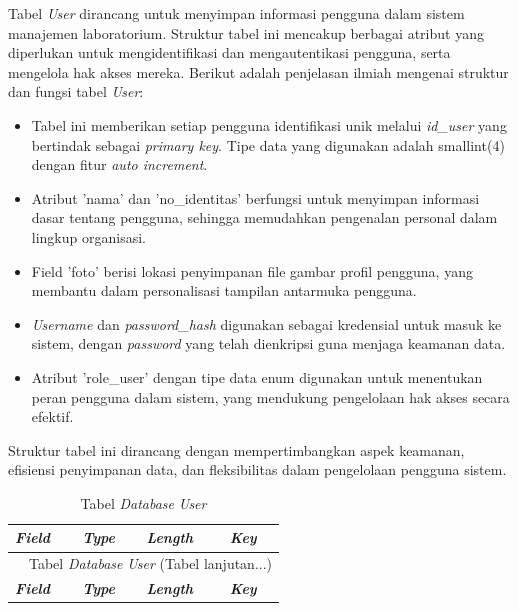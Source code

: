 \begin{enumerate}
	      Tabel \textit{User} dirancang untuk menyimpan informasi pengguna dalam sistem manajemen laboratorium. Struktur tabel ini mencakup berbagai atribut yang diperlukan untuk mengidentifikasi dan mengautentikasi pengguna, serta mengelola hak akses mereka. Berikut adalah penjelasan ilmiah mengenai struktur dan fungsi tabel \textit{User}:

	      \begin{itemize}
		      \item Tabel ini memberikan setiap pengguna identifikasi unik melalui \textit{id\_user} yang bertindak sebagai \textit{primary key}. Tipe data yang digunakan adalah smallint(4) dengan fitur \textit{auto increment}.
		      \item Atribut 'nama' dan 'no\_identitas' berfungsi untuk menyimpan informasi dasar tentang pengguna, sehingga memudahkan pengenalan personal dalam lingkup organisasi.
		      \item Field 'foto' berisi lokasi penyimpanan file gambar profil pengguna, yang membantu dalam personalisasi tampilan antarmuka pengguna.
		      \item \textit{Username} dan \textit{password\_hash} digunakan sebagai kredensial untuk masuk ke sistem, dengan \textit{password} yang telah dienkripsi guna menjaga keamanan data.
		      \item Atribut 'role\_user' dengan tipe data enum digunakan untuk menentukan peran pengguna dalam sistem, yang mendukung pengelolaan hak akses secara efektif.
	      \end{itemize}

	      Struktur tabel ini dirancang dengan mempertimbangkan aspek keamanan, efisiensi penyimpanan data, dan fleksibilitas dalam pengelolaan pengguna sistem.

		      {
			      \fontsize{10}{12}\selectfont
			      \begin{longtable}{l l l l}
				      \caption{Tabel \textit{\textit{Database}} \textit{User}}
				      \label{admin}                                                                                                                 \\
				      \hline
				      \textbf{\textit{Field}} & \textbf{\textit{Type}} & \textbf{\textit{Length}}                           & \textbf{\textit{Key}} \\
				      \hline
				      \endfirsthead

				      \multicolumn{4}{c}{\tablename\ \thetable\ {Tabel \textit{\textit{Database}} \textit{User}} \space (Tabel lanjutan...)}        \\
				      \hline
				      \textbf{\textit{Field}} & \textbf{\textit{Type}} & \textbf{\textit{Length}}                           & \textbf{\textit{Key}} \\
				      \hline
				      \endhead


\end{longtable}}
\end{enumerate}
